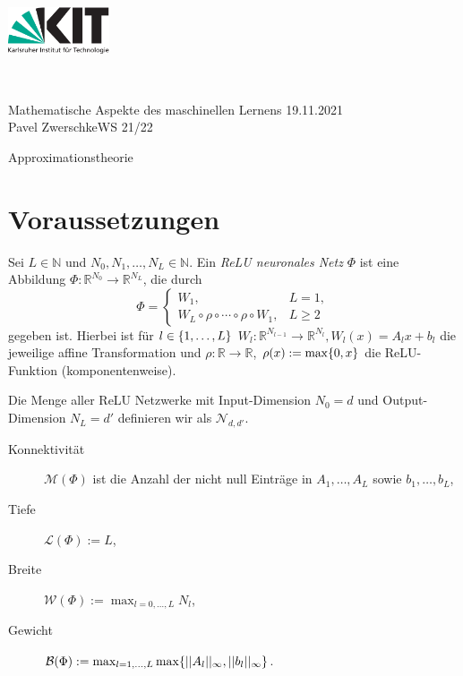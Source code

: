\documentclass[11pt]{scrartcl}
\def\Semester{WS 21/22}
\def\Seminar{Mathematische Aspekte des maschinellen Lernens}
\def\Title{Approximationstheorie}
\def\Author{Pavel Zwerschke}
\def\Date{19.11.2021} %
\newcommand{\N}{\mathbb{N}} %
\newcommand{\R}{\mathbb{R}} %
\begin{document}
\vspace*{-2cm}
\begin{minipage}{3cm}
	\includegraphics[width=3cm]{./logos/kit-de.pdf} %
\end{minipage}\hspace*{0.2cm}~
\begin{minipage}{14cm}{
		\sffamily \Large{\Seminar} \hfill \Date \\ 
		\Author \hfill \Semester
}\end{minipage}
\vspace{-0.5cm}
\begin{center}
	\huge \sffamily \Title
\end{center}
\vspace{-1cm}

\section{Voraussetzungen}
\label{sec:prerequisites}

\begin{definition}
	Sei \(L \in \N\) und \(N_0, N_1, \ldots, N_L \in \N\). Ein 
	\textit{ReLU neuronales Netz} \(\Phi\) ist eine Abbildung 
	\(\Phi: \R^{N_0} \rightarrow \R^{N_L}\), die durch 
	\[ \Phi = \begin{cases}
		W_1, & L = 1, \\
		W_L \circ \rho \circ \cdots \circ \rho \circ W_1, & L \geq 2
	\end{cases} \]
	gegeben ist. Hierbei ist für \(l\in \{1,\ldots, L\}\) \(W_l : \R^{N_{l-1}} \rightarrow \R^{N_l}, W_l(x) = A_l x + b_l\) 
	die jeweilige affine Transformation und \(\rho: \R \rightarrow \R\), \(\rho(x) := \max\{0, x\}\) 
	die ReLU-Funktion (komponentenweise).

	Die Menge aller ReLU Netzwerke mit Input-Dimension \(N_0 = d\) und Output-Dimension \(N_L = d'\) 
	definieren wir als \(\mathcal{N}_{d,d'}\).
\end{definition}

\begin{definition}\leavevmode
	\begin{description}
		\item[Konnektivität] \(\mathcal{M}(\Phi)\) ist die Anzahl der nicht null Einträge in \(A_1, \ldots, A_L\) 
		sowie \(b_1, \ldots, b_L\),
		\item[Tiefe] \(\mathcal{L}(\Phi) := L\),
		\item[Breite] \(\mathcal{W}(\Phi) := \max_{l=0,\ldots, L} N_l\),
		\item[Gewicht] \(\mathcal{B}(\Phi) := \max_{l=1,\ldots, L} \max\{||A_l ||_\infty, ||b_l||_\infty\}\).
	\end{description}
\end{definition}
\end{document}

